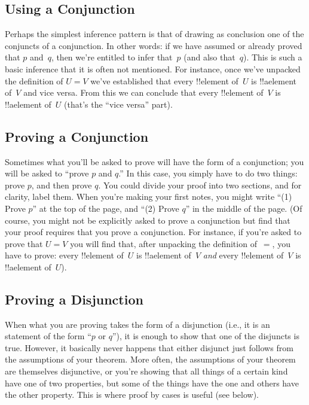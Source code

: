 \documentclass[../../../include/open-logic-section]{subfiles}
\begin{document}
\subsection{Using a Conjunction}

Perhaps the simplest inference pattern is that of drawing as
conclusion one of the conjuncts of a conjunction. In other words: if
we have assumed or already proved that $p$ and~$q$, then we're
entitled to infer that~$p$ (and also that~$q$).  This is such a basic
inference that it is often not mentioned.  For instance, once we've
unpacked the definition of $U = V$ we've established that every
!!{element} of~$U$ is !!a{element} of~$V$ and vice versa. From this
we can conclude that every !!{element} of~$V$ is !!a{element} of~$U$
(that's the ``vice versa'' part).  

\subsection{Proving a Conjunction}

Sometimes what you'll be asked to prove will have the form of a
conjunction; you will be asked to ``prove $p$ and $q$.'' In this case,
you simply have to do two things: prove $p$, and then prove $q$. You
could divide your proof into two sections, and for clarity, label
them. When you're making your first notes, you might write ``(1) Prove
$p$'' at the top of the page, and ``(2) Prove $q$'' in the middle of
the page. (Of course, you might not be explicitly asked to prove a
conjunction but find that your proof requires that you prove a
conjunction. For instance, if you're asked to prove that $U = V$ you
will find that, after unpacking the definition of~$=$, you have to
prove: every !!{element} of~$U$ is !!a{element} of~$V$
\emph{and} every !!{element} of~$V$ is !!a{element} of~$U$).

\subsection{Proving a Disjunction}

When what you are proving takes the form of a disjunction (i.e., it is
an statement of the form ``$p$ or $q$''), it is enough to show that
one of the disjuncts is true.  However, it basically never happens
that either disjunct just follows from the assumptions of your
theorem. More often, the assumptions of your theorem are themselves
disjunctive, or you're showing that all things of a certain kind have
one of two properties, but some of the things have the one and others
have the other property.  This is where proof by cases is
useful (see below).
\end{document}
